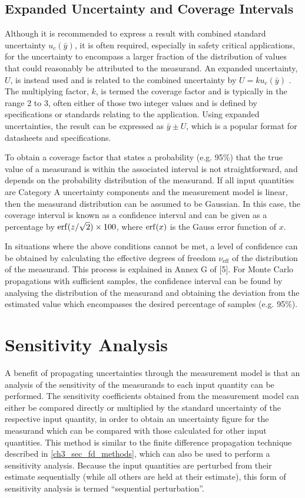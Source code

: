 \documentclass[../thesis/thesis.tex]{subfiles}
\begin{document}
\begin{refsection}
\subsection{Expanded Uncertainty and Coverage Intervals}

Although it is recommended to express a result with combined standard uncertainty $u_c({\bar{y}})$, it is often required, especially in safety critical applications, for the uncertainty to encompass a larger fraction of the distribution of values that could reasonably be attributed to the measurand. An expanded uncertainty, $U$, is instead used and is related to the combined uncertainty by $U=ku_c(\bar{y})$ \cite[6.2.1]{GUM_2008}. The multiplying factor, $k$, is termed the coverage factor and is typically in the range 2 to 3, often either of those two integer values and is defined by specifications or standards relating to the application.  Using expanded uncertainties, the result can be expressed as $\bar{y} \pm U$, which is a popular format for datasheets and specifications.

To obtain a coverage factor that states a probability (e.g. 95\%) that the true value of a measurand is within the associated interval is not straightforward, and depends on the probability distribution of the measurand. If all input quantities are Category A uncertainty components and the measurement model is linear, then the measurand distribution can be assumed to be Gaussian. In this case, the coverage interval is known as a confidence interval and can be given as a percentage by  $\operatorname{erf}(z/\sqrt{2})\times 100$, where $\operatorname{erf}(x)$ is the Gauss error function of $x$.
 
In situations where the above conditions cannot be met, a level of confidence can be obtained by calculating the effective degrees of freedom $\nu_\text{eff}$ of the distribution of the measurand. This process is explained in Annex G of [5]. For Monte Carlo propagations with sufficient samples, the confidence interval can be found by analysing the distribution of the measurand and obtaining the deviation from the estimated value which encompasses the desired percentage of samples (e.g. 95\%).

\section{Sensitivity Analysis}

A benefit of propagating uncertainties through the measurement model is that an analysis of the sensitivity of the measurands to each input quantity can be performed. The sensitivity coefficients obtained from the measurement model can either be compared directly or multiplied by the standard uncertainty of the respective input quantity, in order to obtain an uncertainty figure for the measurand which can be compared with those calculated for other input quantities. This method is similar to the finite difference propagation technique described in \ref{ch3_sec_fd_methods}, which can also be used to perform a sensitivity analysis. Because the input quantities are perturbed from their estimate sequentially (while all others are held at their estimate), this form of sensitivity analysis is termed ``sequential perturbation''.


\end{refsection}
\end{document}
